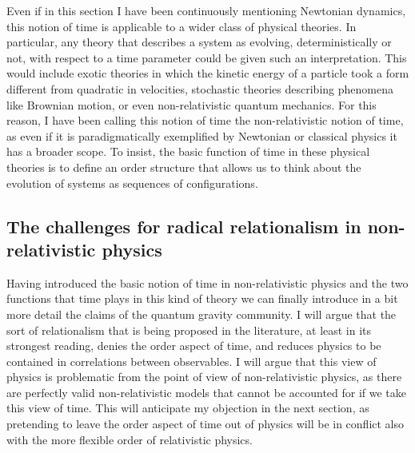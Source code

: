 \documentclass[12 pt]{article}
\begin{document}
Even if in this section I have been continuously mentioning Newtonian dynamics, this notion of time is applicable to a wider class of physical theories. In particular, any theory that describes a system as evolving, deterministically or not, with respect to a time parameter could be given such an interpretation. This would include exotic theories in which the kinetic energy of a particle took a form different from quadratic in velocities, stochastic theories describing phenomena like Brownian motion, or even non-relativistic quantum mechanics. For this reason, I have been calling this notion of time the non-relativistic notion of time, as even if it is paradigmatically exemplified by Newtonian or classical physics it has a broader scope. To insist, the basic function of time in these physical theories is to define an order structure that allows us to think about the evolution of systems as sequences of configurations.
 
\subsection{The challenges for radical relationalism in non-relativistic physics}\label{sect_relationalism_non-rel}

Having introduced the basic notion of time in non-relativistic physics and the two functions that time plays in this kind of theory we can finally introduce in a bit more detail the claims of the quantum gravity community. I will argue that the sort of relationalism that is being proposed in the literature, at least in its strongest reading, denies the order aspect of time, and reduces physics to be contained in correlations between observables. I will argue that this view of physics is problematic from the point of view of non-relativistic physics, as there are perfectly valid non-relativistic models that cannot be accounted for if we take this view of time. This will anticipate my objection in the next section, as pretending to leave the order aspect of time out of physics will be in conflict also with the more flexible order of relativistic physics.
\end{document}
